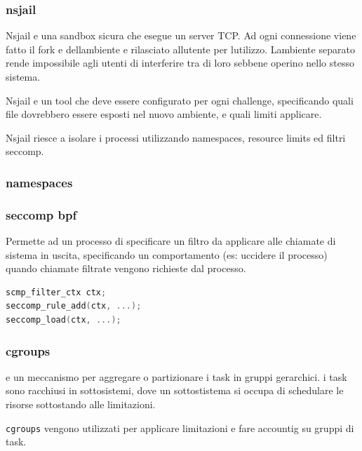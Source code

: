 \subsubsection{nsjail}\label{nsjail}

Nsjail e\textquotesingle{} una sandbox sicura che esegue un server TCP.
Ad ogni connessione viene fatto il fork e dell\textquotesingle ambiente
e rilasciato all\textquotesingle utente per l\textquotesingle utilizzo.
L\textquotesingle ambiente separato rende impossibile agli utenti di
interferire tra di loro sebbene operino nello stesso sistema.

Nsjail e\textquotesingle{} un tool che deve essere configurato per ogni
challenge, specificando quali file dovrebbero essere esposti nel nuovo
ambiente, e quali limiti applicare.

Nsjail riesce a isolare i processi utilizzando namespaces, resource
limits ed filtri seccomp.

\subsubsection{namespaces}\label{namespaces}

\subsubsection{seccomp bpf}\label{seccomp-bpf}

Permette ad un processo di specificare un filtro da applicare alle
chiamate di sistema in uscita, specificando un comportamento (es:
uccidere il processo) quando chiamate filtrate vengono richieste dal
processo.

\begin{lstlisting}[language=C]
scmp_filter_ctx ctx;
seccomp_rule_add(ctx, ...);
seccomp_load(ctx, ...);
\end{lstlisting}

\subsubsection{cgroups}\label{cgroups}

e\textquotesingle{} un meccanismo per aggregare o partizionare i task in
gruppi gerarchici. i task sono racchiusi in sottosistemi, dove un
sottostistema si occupa di schedulare le risorse sottostando alle
limitazioni.

\passthrough{\lstinline!cgroups!} vengono utilizzati per applicare
limitazioni e fare accountig su gruppi di task.
